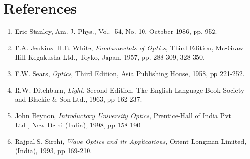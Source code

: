 \section*{References}

\begin{enumerate}
\itemsep0em
    \item Eric Stanley, Am. J. Phys., Vol.- 54, No.-10, October 1986, pp. 952.
    \item F.A. Jenkins, H.E. White, \textit{Fundamentals of Optics}, Third Edition, Mc-Graw Hill Kogakusha Ltd., Toyko, Japan, 1957, pp. 288-309, 328-350.
    \item F.W. Sears, \textit{Optics}, Third Edition, Asia Publishing House, 1958, pp 221-252.
    \item R.W. Ditchburn, \textit{Light}, Second Edition, The English Language Book Society and Blackie \& Son Ltd., 1963, pp 162-237.
    \item John Beynon, \textit{Introductory University Optics}, Prentice-Hall of India Pvt. Ltd., New Delhi (India), 1998, pp 158-190.
    \item Rajpal S. Sirohi, \textit{Wave Optics and its Applications}, Orient Longman Limited, (India), 1993, pp 169-210.
\end{enumerate}